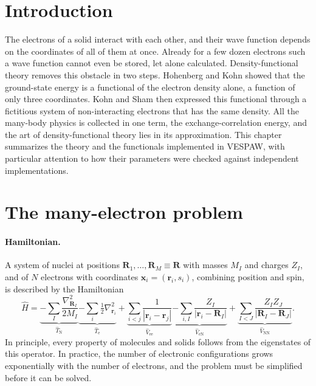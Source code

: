 \documentclass[11pt,a4paper,oneside]{book}
\begin{document}
\section{Introduction}

The electrons of a solid interact with each other, and their wave
function depends on the coordinates of all of them at once. Already
for a few dozen electrons such a wave function cannot even be stored,
let alone calculated. Density-functional theory removes this obstacle
in two steps. Hohenberg and Kohn showed that the ground-state energy is
a functional of the electron density alone, a function of only three
coordinates. Kohn and Sham then expressed this functional through a
fictitious system of non-interacting electrons that has the same
density. All the many-body physics is collected in one term, the
exchange-correlation energy, and the art of density-functional theory
lies in its approximation. This chapter summarizes the theory and the
functionals implemented in VESPAW, with particular attention to how
their parameters were checked against independent implementations.


\section{The many-electron problem}

\paragraph{Hamiltonian.} A system of nuclei at positions
$\bm R_1,\dots,\bm R_M\equiv\bm R$ with masses $M_I$ and charges $Z_I$,
and of $N$ electrons with coordinates $\bm x_i=(\bm r_i,s_i)$, combining
position and spin, is described by the Hamiltonian
\begin{equation}
  \hat H = \underbrace{-\sum_I\frac{\nabla^2_{\bm R_I}}{2M_I}}_{\hat T_{\mathrm N}}
  \underbrace{-\sum_i\tfrac12\nabla^2_{\bm r_i}}_{\hat T_{\mathrm e}}
  +\underbrace{\sum_{i<j}\frac{1}{|\bm r_i-\bm r_j|}}_{\hat V_{\mathrm{ee}}}
  \underbrace{-\sum_{i,I}\frac{Z_I}{|\bm r_i-\bm R_I|}}_{\hat V_{\mathrm{eN}}}
  +\underbrace{\sum_{I<J}\frac{Z_IZ_J}{|\bm R_I-\bm R_J|}}_{\hat V_{\mathrm{NN}}} .
  \label{eq:fullH}
\end{equation}
In principle, every property of molecules and solids follows from the
eigenstates of this operator. In practice, the number of electronic
configurations grows exponentially with the number of electrons, and
the problem must be simplified before it can be solved.
\end{document}

